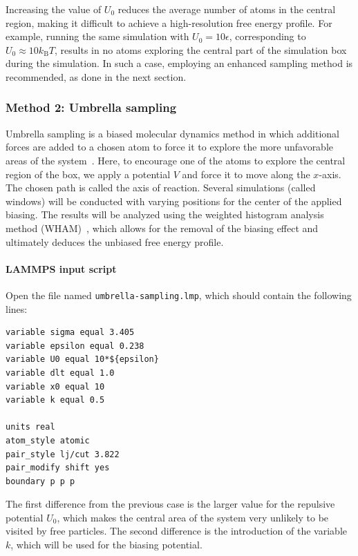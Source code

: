\documentclass[9pt,tutorial]{livecoms}
\newcommand{\flecmd}[1]{\textcolor{command}{\texttt{#1}}} %
\begin{document}
Increasing the value of $U_0$ reduces the average number of atoms in the central
region, making it difficult to achieve a high-resolution free energy profile.
For example, running the same simulation with $U_0 = 10 \epsilon$,
corresponding to $U_0 \approx 10 k_\text{B} T$, results in no atoms exploring
the central part of the simulation box during the simulation.
In such a case, employing an enhanced sampling method is recommended, as done in the next section.

\subsubsection{Method 2: Umbrella sampling}

Umbrella sampling is a biased molecular dynamics method in which
additional forces are added to a chosen atom to force it to explore the
more unfavorable areas of the system~\cite{kastner2011umbrella,
  allen2017computer, frenkel2023understanding}.  Here, to encourage one
of the atoms to explore the central region of the box, we apply a
potential $V$ and force it to move along the $x$-axis. The chosen path
is called the axis of reaction. Several simulations (called windows)
will be conducted with varying positions for the center of the applied
biasing. The results will be analyzed using the weighted histogram
analysis method (WHAM)~\cite{kumar1992weighted,kumar1995multidim}, which
allows for the removal of the biasing effect and ultimately deduces the
unbiased free energy profile.

\paragraph{LAMMPS input script}

Open the file named \flecmd{umbrella-sampling.lmp}, which should
contain the following lines:
\begin{lstlisting}
variable sigma equal 3.405
variable epsilon equal 0.238
variable U0 equal 10*${epsilon}
variable dlt equal 1.0
variable x0 equal 10
variable k equal 0.5

units real
atom_style atomic
pair_style lj/cut 3.822
pair_modify shift yes
boundary p p p
\end{lstlisting}
The first difference from the previous case is the larger value
for the repulsive potential $U_0$, which makes the central area
of the system very unlikely to be visited by free particles.  The second
difference is the introduction of the variable $k$, which will be used for
the biasing potential.
\end{document}
